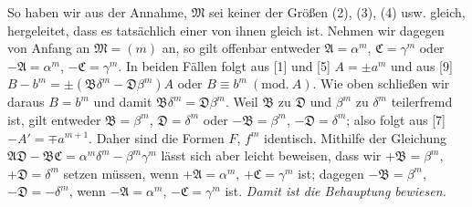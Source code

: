 So haben wir aus der Annahme, $\mathfrak{M}$ sei keiner der Größen (2), (3), (4) usw. gleich, hergeleitet, dass es tatsächlich einer von ihnen gleich ist. Nehmen wir dagegen von
Anfang an $\mathfrak{M}=(m)$ an, so gilt offenbar entweder $\mathfrak{A}=\alpha^m$, $\mathfrak{C}=\gamma^m$ oder $-\mathfrak{A}=\alpha^m$, $-\mathfrak{C}=\gamma^m$. In beiden Fällen folgt aus [1] und [5] $A=\pm a^m$ und aus [9] $B-b^m=\pm(\mathfrak{B}\delta^m-\mathfrak{D}\beta^m)A$ oder $B\equiv b^m\ (\mathrm{mod.}\ A)$. Wie oben schließen wir daraus $B=b^m$ und damit $\mathfrak{B}\delta^m=\mathfrak{D}\beta^m$. Weil $\mathfrak{B}$ zu $\mathfrak{D}$ und $\beta^m$ zu $\delta^m$ teilerfremd ist, gilt entweder $\mathfrak{B}=\beta^m$, $\mathfrak{D}=\delta^m$ oder $-\mathfrak{B}=\beta^m$, $-\mathfrak{D}=\delta^m$; also folgt aus [7] $-A'=\mp a^{m+1}$. Daher sind die Formen $F$, $f^m$ identisch. Mithilfe der Gleichung $\mathfrak{A}\mathfrak{D}-\mathfrak{B}\mathfrak{C}=\alpha^m\delta^m-\beta^m\gamma^m$ lässt sich aber leicht beweisen, dass wir $+\mathfrak{B}=\beta^m$, $+\mathfrak{D}=\delta^m$ setzen müssen, wenn $+\mathfrak{A}=\alpha^m$, $+\mathfrak{C}=\gamma^m$ ist; dagegen $-\mathfrak{B}=\beta^m$, ${-\mathfrak{D}=-\delta^m}$, wenn $-\mathfrak{A}=\alpha^m$, $-\mathfrak{C}=\gamma^m$ ist. \textit{Damit ist die Behauptung bewiesen.}

